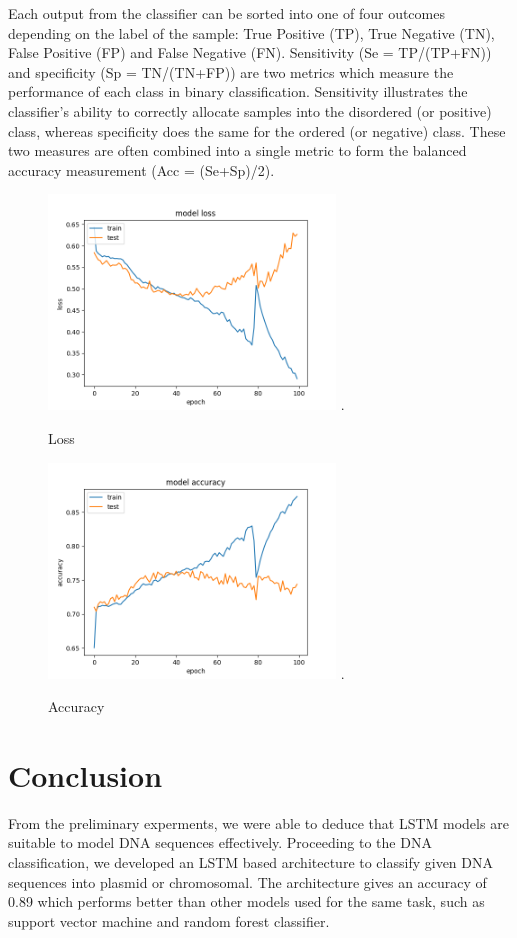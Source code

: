 \documentclass[conference]{IEEEtran}
\begin{document}
Each output from the classifier can be sorted into one of
four outcomes depending on the label of the sample: 
True Positive (TP), True Negative (TN), False Positive (FP) and False Negative (FN). Sensitivity (Se = TP/(TP+FN)) and specificity (Sp = TN/(TN+FP)) are two metrics which measure the performance of each class in binary classification. Sensitivity illustrates the classifier’s ability to correctly allocate samples into the disordered (or positive) class, whereas specificity does the same for the ordered (or negative) class. These two measures are often combined into a single metric to form the balanced accuracy measurement (Acc = (Se+Sp)/2).
\begin{figure}[h]
\centering
\includegraphics[width=3in]{loss.png}
\DeclareGraphicsExtensions.
\caption{Loss}
\label{fig_sim}
\end{figure}

\begin{figure}[h]
\centering
\includegraphics[width=3in]{accuracy.png}
\DeclareGraphicsExtensions.
\caption{Accuracy}
\label{fig_sim}
\end{figure}

\section{Conclusion}
From the preliminary experments, we were able to deduce that LSTM models are suitable to model DNA sequences effectively. Proceeding to the DNA classification, we developed an LSTM based architecture to classify given DNA sequences into plasmid or chromosomal. The architecture gives an accuracy of 0.89 which performs better than other models used for the same task, such as support vector machine and random forest classifier.
\end{document}
